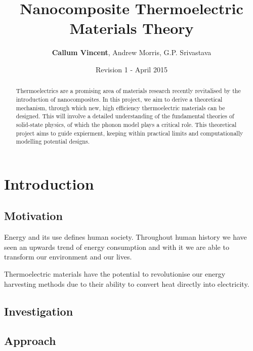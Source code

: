 \documentclass[12pt,titlepage,draft]{article}
\begin{document}
\title{Nanocomposite Thermoelectric Materials Theory}
\author{\textbf{Callum Vincent}, Andrew Morris, G.P. Srivastava}
\date{Revision 1 - April 2015}
\maketitle

\tableofcontents

\begin{abstract}

Thermoelectrics are a promising area of materials research recently revitalised by the introduction of nanocomposites. In this project, we aim to derive a theoretical mechanism, through which new, high efficiency thermoelectric materials can be designed. This will involve a detailed understanding of the fundamental theories of solid-state physics, of which the phonon model plays a critical role. This theoretical project aims to guide expierment, keeping within practical limits and computationally modelling potential designs.
\end{abstract}

\section{Introduction}
\subsection{Motivation}
Energy and its use defines human society. Throughout human history we have seen an upwards trend of energy consumption and with it we are able to transform our environment and our lives.

Thermoelectric materials have the potential to revolutionise our energy harvesting methods due to their ability to convert heat directly into electricity.

\subsection{Investigation}

\subsection{Approach}
\end{document}
